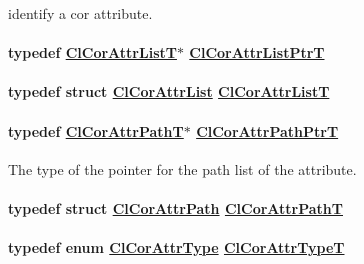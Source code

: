 identify a cor attribute. \hypertarget{group__group13_ga58}{
\paragraph[ClCorAttrListPtrT]{\setlength{\rightskip}{0pt plus 5cm}typedef \hyperlink{struct_cl_cor_attr_list}{Cl\-Cor\-Attr\-List\-T}$\ast$ \hyperlink{struct_cl_cor_attr_list}{Cl\-Cor\-Attr\-List\-Ptr\-T}}\hfill}
\label{group__group13_ga58}


\hypertarget{group__group13_ga57}{
\paragraph[ClCorAttrListT]{\setlength{\rightskip}{0pt plus 5cm}typedef struct \hyperlink{struct_cl_cor_attr_list}{Cl\-Cor\-Attr\-List}  \hyperlink{struct_cl_cor_attr_list}{Cl\-Cor\-Attr\-List\-T}}\hfill}
\label{group__group13_ga57}


\hypertarget{group__group13_ga33}{
\paragraph[ClCorAttrPathPtrT]{\setlength{\rightskip}{0pt plus 5cm}typedef \hyperlink{struct_cl_cor_attr_path}{Cl\-Cor\-Attr\-Path\-T}$\ast$ \hyperlink{struct_cl_cor_attr_path}{Cl\-Cor\-Attr\-Path\-Ptr\-T}}\hfill}
\label{group__group13_ga33}


The type of the pointer for the path list of the attribute. \hypertarget{group__group13_ga32}{
\paragraph[ClCorAttrPathT]{\setlength{\rightskip}{0pt plus 5cm}typedef struct \hyperlink{struct_cl_cor_attr_path}{Cl\-Cor\-Attr\-Path} \hyperlink{struct_cl_cor_attr_path}{Cl\-Cor\-Attr\-Path\-T}}\hfill}
\label{group__group13_ga32}


\hypertarget{group__group13_ga10}{
\paragraph[ClCorAttrTypeT]{\setlength{\rightskip}{0pt plus 5cm}typedef enum \hyperlink{group__group13_ga326}{Cl\-Cor\-Attr\-Type}  \hyperlink{group__group13_ga10}{Cl\-Cor\-Attr\-Type\-T}}\hfill}
\label{group__group13_ga10}



